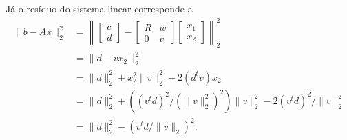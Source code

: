 \documentclass[a4paper,12pt, leqno, answers]{exam}
\begin{document}
\begin{questions}
\begin{solution}
        J\'{a} o res\'{i}duo do sistema linear corresponde a
        \begin{align*}
            \| b - A x \|_2^2 &= \left\| \begin{bmatrix}
                c \\
                d
            \end{bmatrix} - \begin{bmatrix}
                R & w \\
                0 & v
            \end{bmatrix} \begin{bmatrix}
                x_1 \\
                x_2
            \end{bmatrix} \right\|_2^2 \\
            &= \| d - v x_2 \|_2^2 \\
            &= \| d \|_2^2 + x_2^2 \| v \|_2^2 - 2 (d^t v) x_2 \\
            &= \| d \|_2^2 + \left( (v^t d)^2 / (\| v \|_2^2)^2 \right) \| v \|_2^2 - 2 (v^t d)^2 / \| v \|_2^2 \\
            &= \| d \|_2^2 - \left( v^t d / \| v \|_2 \right)^2.
        \end{align*}
    \end{solution}
\end{questions}


\end{document}
